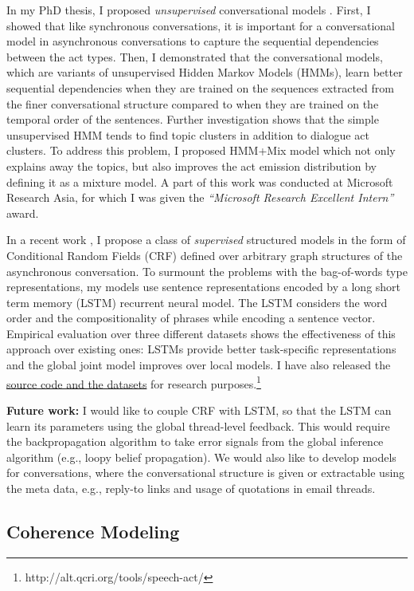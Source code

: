 \documentclass{article} %
\begin{document}
In my PhD thesis, I proposed \emph{unsupervised} conversational models  \cite{Shafiq11b}.  First, I showed that like synchronous conversations, it is important for a conversational model in asynchronous conversations to capture the sequential dependencies between the act types. Then, I demonstrated that the conversational models, which are variants of unsupervised Hidden Markov Models (HMMs), learn better sequential dependencies when they are trained on the sequences extracted from the finer conversational structure compared to when they are trained on the temporal order of the sentences. Further investigation shows that the simple unsupervised HMM tends to find topic clusters in addition to dialogue act clusters. To address this problem, I proposed HMM+Mix model which not only explains away the topics, but also improves the act emission distribution by defining it as a mixture model. A part of this work was conducted at Microsoft Research Asia, for which I was given the \emph{``Microsoft Research Excellent Intern''} award.   

In a recent work \cite{Shafiq16ACL}, I propose a class of \emph{supervised} structured models in the form of Conditional Random Fields (CRF) defined over arbitrary graph structures of the asynchronous conversation. To surmount the problems with the bag-of-words type representations, my models use sentence representations encoded by a long short term memory (LSTM) recurrent neural model. The LSTM considers the word order and the compositionality of phrases while encoding a sentence vector. Empirical evaluation over three different datasets shows the effectiveness of this approach over existing ones: LSTMs provide better task-specific representations and the global joint model improves over local models. I have also released the \href{http://alt.qcri.org/tools/speech-act/}{source code and the datasets} for research purposes.\footnote{http://alt.qcri.org/tools/speech-act/}

\textbf{Future work:} I would like to couple CRF with LSTM, so that the LSTM can learn its parameters using
the global thread-level feedback. This would require the backpropagation algorithm to take error signals from the global inference algorithm (e.g., loopy belief propagation). We would also like to develop models for  conversations, where the conversational structure is given or extractable using the meta data, e.g., reply-to links and usage of quotations in email threads.


\subsection{Coherence Modeling} \label{coh-model}
\end{document}
